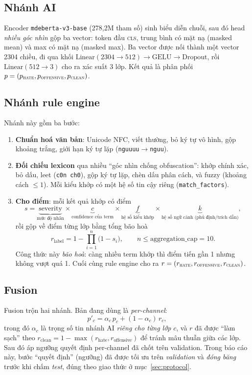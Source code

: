 \documentclass[11pt,a4paper]{article}
\newcommand{\code}[1]{\texttt{\small #1}}
\begin{document}
\subsection{Nhánh AI}
Encoder \code{mdeberta-v3-base} (278{,}2M tham số) sinh biểu diễn chuỗi, sau đó
head \emph{nhiều góc nhìn} gộp ba vector: token đầu \textsc{cls}, trung bình có
mặt nạ (masked mean) và max có mặt nạ (masked max).  Ba vector được nối thành
một vector 2304 chiều, đi qua khối
$\mathrm{Linear}(2304{\to}512)\to\mathrm{GELU}\to\mathrm{Dropout}$, rồi
$\mathrm{Linear}(512{\to}3)$ cho ra xác suất 3 lớp.  Kết quả là phân phối
$p=(p_{\textsc{hate}},p_{\textsc{offensive}},p_{\textsc{clean}})$.

\subsection{Nhánh rule engine}
Nhánh này gồm ba bước:
\begin{enumerate}[leftmargin=1.6em]
  \item \textbf{Chuẩn hoá văn bản}: Unicode NFC, viết thường, bỏ ký tự vô hình,
  gộp khoảng trắng, giới hạn ký tự lặp (\code{nguuuu}$\to$\code{nguu}).
  \item \textbf{Đối chiếu lexicon} qua nhiều ``góc nhìn chống obfuscation'':
  khớp chính xác, bỏ dấu, leet (\code{c0n ch0}), gộp ký tự lặp, chèn dấu phân
  cách, và fuzzy (khoảng cách $\le 1$).  Mỗi kiểu khớp có một hệ số tin cậy
  riêng (\code{match\_factors}).
  \item \textbf{Cho điểm}: mỗi kết quả khớp có điểm
  \[
    s = \underbrace{\text{severity}}_{\text{mức độ nhãn}}
        \times \underbrace{c}_{\text{confidence của term}}
        \times \underbrace{f}_{\text{hệ số kiểu khớp}}
        \times \underbrace{k}_{\text{hệ số ngữ cảnh (phủ định/trích dẫn)}},
  \]
  rồi gộp về điểm từng lớp bằng tổng bão hoà
  \[
    r_{\text{label}} = 1 - \prod_{i=1}^{n}\bigl(1 - s_i\bigr),
    \qquad n \le \text{aggregation\_cap} = 10 .
  \]
  Công thức này \emph{bão hoà}: càng nhiều term khớp thì điểm tiến gần 1 nhưng
  không vượt quá 1.  Cuối cùng rule engine cho ra $r=(r_{\textsc{hate}},
  r_{\textsc{offensive}},r_{\textsc{clean}})$.
\end{enumerate}

\subsection{Fusion}
Fusion trộn hai nhánh.  Bản đang dùng là \emph{per-channel}:
\[
  p'_{c} = \alpha_c\, p_{c} + (1-\alpha_c)\, r_{c},
\]
trong đó $\alpha_c$ là trọng số tin nhánh AI \emph{riêng cho từng lớp} $c$, và
$r$ đã được ``làm sạch'' theo $r_{\text{clean}} = 1 - \max(r_{\text{hate}},
r_{\text{offensive}})$ để tránh mâu thuẫn giữa các lớp.  Sau đó áp ngưỡng quyết
định per-channel đã chốt trên validation.  Trong báo cáo này, bước ``quyết
định'' (ngưỡng) đã được tối ưu trên \emph{validation} và \emph{đóng băng} trước
khi chấm \emph{test}, đúng theo giao thức ở mục~\ref{sec:protocol}.
\end{document}
